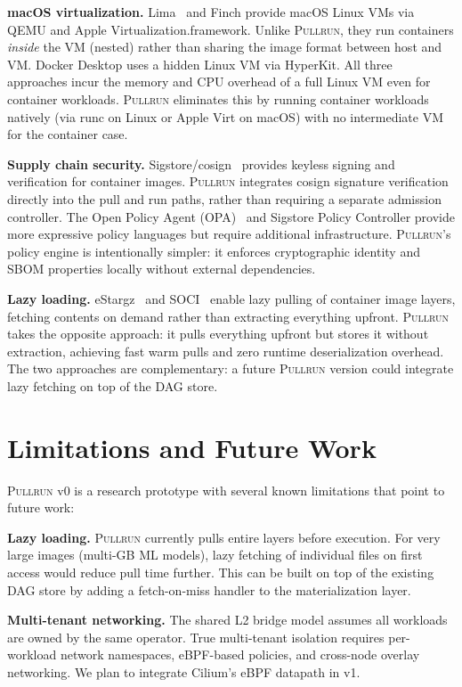 \documentclass[11pt,a4paper]{article}
\newcommand{\pullrun}{\textsc{Pullrun}}
\begin{document}
\textbf{macOS virtualization.} Lima~\cite{lima} and Finch provide macOS Linux VMs via QEMU and Apple Virtualization.framework. Unlike \pullrun{}, they run containers \emph{inside} the VM (nested) rather than sharing the image format between host and VM. Docker Desktop uses a hidden Linux VM via HyperKit. All three approaches incur the memory and CPU overhead of a full Linux VM even for container workloads. \pullrun{} eliminates this by running container workloads natively (via runc on Linux or Apple Virt on macOS) with no intermediate VM for the container case.

\textbf{Supply chain security.} Sigstore/cosign~\cite{sigstore} provides keyless signing and verification for container images. \pullrun{} integrates cosign signature verification directly into the pull and run paths, rather than requiring a separate admission controller. The Open Policy Agent (OPA)~\cite{opa} and Sigstore Policy Controller provide more expressive policy languages but require additional infrastructure. \pullrun{}'s policy engine is intentionally simpler: it enforces cryptographic identity and SBOM properties locally without external dependencies.

\textbf{Lazy loading.} eStargz~\cite{estargz} and SOCI~\cite{soci} enable lazy pulling of container image layers, fetching contents on demand rather than extracting everything upfront. \pullrun{} takes the opposite approach: it pulls everything upfront but stores it without extraction, achieving fast warm pulls and zero runtime deserialization overhead. The two approaches are complementary: a future \pullrun{} version could integrate lazy fetching on top of the DAG store.

\section{Limitations and Future Work}\label{sec:limitations}

\pullrun{} v0 is a research prototype with several known limitations that point to future work:

\textbf{Lazy loading.} \pullrun{} currently pulls entire layers before execution. For very large images (multi-GB ML models), lazy fetching of individual files on first access would reduce pull time further. This can be built on top of the existing DAG store by adding a fetch-on-miss handler to the materialization layer.

\textbf{Multi-tenant networking.} The shared L2 bridge model assumes all workloads are owned by the same operator. True multi-tenant isolation requires per-workload network namespaces, eBPF-based policies, and cross-node overlay networking. We plan to integrate Cilium's eBPF datapath in v1.
\end{document}
